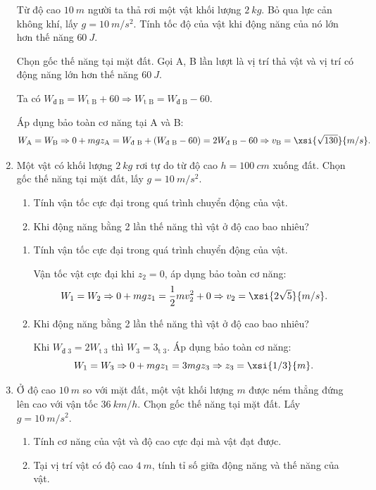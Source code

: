 \begin{enumerate}[label=\bfseries Câu \arabic*:]
	
	{
		Từ độ cao $\SI{10}{m}$ người ta thả rơi một vật khối lượng $\SI{2}{kg}$. Bỏ qua lực cản không khí, lấy $g=\SI{10}{m/s^2}$. Tính tốc độ của vật khi động năng của nó lớn hơn thế năng $\SI{60}{J}$.
	}
	
	\hideall
	{	
		Chọn gốc thế năng tại mặt đất. Gọi A, B lần lượt là vị trí thả vật và vị trí có động năng lớn hơn thế năng $\SI{60}{J}$. 
		
		Ta có $W_\text{đ B} = W_\text{t B} + 60 \Rightarrow W_\text{t B} = W_\text{đ B} - 60$.
		
		Áp dụng bảo toàn cơ năng tại A và B:
		$$W_\text{A} = W_\text{B} \Rightarrow 0 + mgz_\text{A} = W_\text{đ B} + (W_\text{đ B} - 60) = 2 W_\text{đ B} - 60 \Rightarrow v_\text{B} = \xsi{\sqrt{130}}{m/s}.$$
	}
	\item {}
	
	
	{
			Một vật có khối lượng $\SI{2}{kg}$ rơi tự do từ độ cao $h=\SI{100}{cm}$ xuống đất. Chọn gốc thế năng tại mặt đất, lấy $g=\SI{10}{m/s^2}$.
		\begin{enumerate}[label=\alph*)]
			\item Tính vận tốc cực đại trong quá trình chuyển động của vật.
			\item Khi động năng bằng 2 lần thế năng thì vật ở độ cao bao nhiêu?
		\end{enumerate}
	}
	
	\hideall
	{	
		\begin{enumerate}[label=\alph*)]
			\item Tính vận tốc cực đại trong quá trình chuyển động của vật.
			
			Vận tốc vật cực đại khi $z_2 = 0$, áp dụng bảo toàn cơ năng:
			$$W_1 = W_2 \Rightarrow 0 + mgz_1 = \dfrac{1}{2}mv_2^2 + 0 \Rightarrow v_2 = \xsi{2\sqrt5}{m/s}.$$
			\item Khi động năng bằng 2 lần thế năng thì vật ở độ cao bao nhiêu?
			
			Khi $W_\text{đ 3} = 2 W_\text{t 3}$ thì $W_3 = 3_\text{t 3}$. Áp dụng bảo toàn cơ năng:
			$$W_1 = W_3 \Rightarrow 0 + mgz_1 = 3 mgz_3 \Rightarrow z_3 = \xsi{1/3}{m}.$$
		\end{enumerate}
	}
	\item {}
	
	
	{
		Ở độ cao $\SI{10}{m}$ so với mặt đất, một vật khối lượng $m$ được ném thẳng đứng lên cao với vận tốc $\SI{36}{km/h}$. Chọn gốc thế năng tại mặt đất. Lấy $g=\SI{10}{m/s^2}$.
		\begin{enumerate}[label=\alph*)]
			\item Tính cơ năng của vật và độ cao cực đại mà vật đạt được.
			\item Tại vị trí vật có độ cao $\SI{4}{m}$, tính tỉ số giữa động năng và thế năng của vật.
		\end{enumerate}
	}
	

\end{enumerate}
